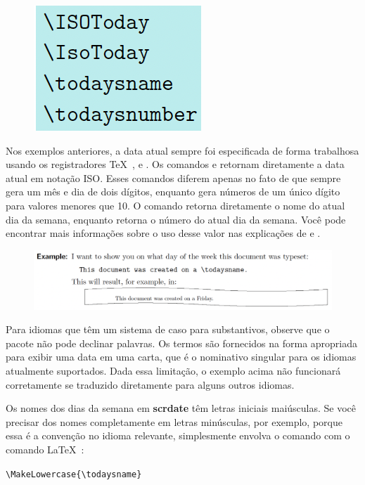 \begin{figure}[ht]
\includegraphics[width=0.25\linewidth]{imagem12.png}
\end{figure}
\newpage
Nos exemplos anteriores, a data atual sempre foi especificada de forma trabalhosa usando os registradores \TeX\ ,  e . Os comandos  e  retornam diretamente a data atual em notação ISO. Esses comandos diferem apenas no fato de que  sempre gera um mês e dia de dois dígitos, enquanto  gera números de um único dígito para valores menores que 10. O comando  retorna diretamente o nome do atual dia da semana, enquanto  retorna o número do atual dia da semana. Você pode encontrar mais informações sobre o uso desse valor nas explicações de  e .

\begin{figure}[h]
    \centering
    \includegraphics[width=1\linewidth]{imagem13.png}
\end{figure}

Para idiomas que têm um sistema de caso para substantivos, observe que o pacote não pode declinar palavras. Os termos são fornecidos na forma apropriada para exibir uma data em uma carta, que é o nominativo singular para os idiomas atualmente suportados. Dada essa limitação, o exemplo acima não funcionará corretamente se traduzido diretamente para alguns outros idiomas.

Os nomes dos dias da semana em \textbf{scrdate} têm letras iniciais maiúsculas. Se você precisar dos nomes completamente em letras minúsculas, por exemplo, porque essa é a convenção no idioma relevante, simplesmente envolva o comando com o comando \LaTeX\ :

\verb|\MakeLowercase{\todaysname}|